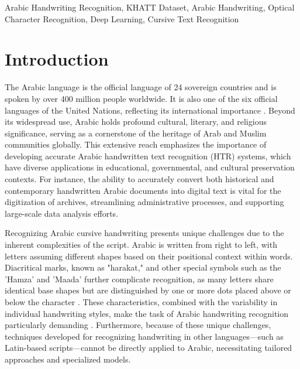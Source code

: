 \documentclass[conference]{IEEEtran}
\begin{document}

\begin{IEEEkeywords}
Arabic Handwriting Recognition, KHATT Dataset, Arabic Handwriting, Optical Character Recognition, Deep Learning, Cursive Text Recognition
\end{IEEEkeywords}

\section{Introduction}

The Arabic language is the official language of 24 sovereign countries and is spoken by over 400 million people worldwide. It is also one of the six official languages of the United Nations, reflecting its international importance \cite{source2}. Beyond its widespread use, Arabic holds profound cultural, literary, and religious significance, serving as a cornerstone of the heritage of Arab and Muslim communities globally. This extensive reach emphasizes the importance of developing accurate Arabic handwritten text recognition (HTR) systems, which have diverse applications in educational, governmental, and cultural preservation contexts. For instance, the ability to accurately convert both historical and contemporary handwritten Arabic documents into digital text is vital for the digitization of archives, streamlining administrative processes, and supporting large-scale data analysis efforts.

Recognizing Arabic cursive handwriting presents unique challenges due to the inherent complexities of the script. Arabic is written from right to left, with letters assuming different shapes based on their positional context within words. Diacritical marks, known as "harakat," and other special symbols such as the 'Hamza' and 'Maada' further complicate recognition, as many letters share identical base shapes but are distinguished by one or more dots placed above or below the character \cite{altwaijry2021arabic}. These characteristics, combined with the variability in individual handwriting styles, make the task of Arabic handwriting recognition particularly demanding \cite{parvez2013offline}. Furthermore, because of these unique challenges, techniques developed for recognizing handwriting in other languages—such as Latin-based scripts—cannot be directly applied to Arabic, necessitating tailored approaches and specialized models.
\end{document}
